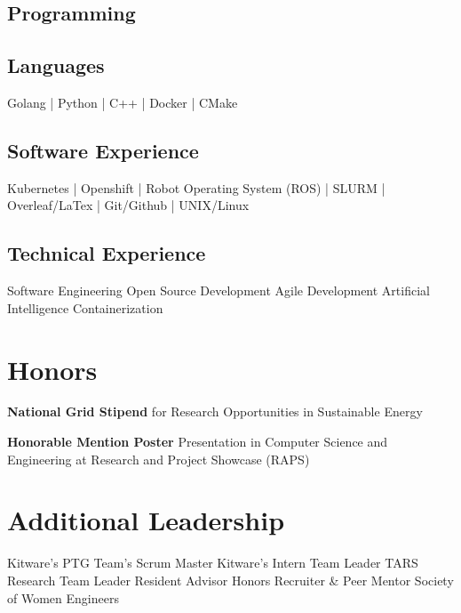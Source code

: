 \documentclass[]{deedy-resume-reversed}
\begin{document}
\begin{minipage}[t]{0.29\textwidth}
\subsection{Programming}
\subsection{Languages}
Golang | Python | C++ | \newline
Docker | CMake
\sectionsep

\subsection{Software Experience}
Kubernetes | Openshift | \newline
Robot Operating System (ROS) | \newline
SLURM |  \newline
Overleaf/LaTex |\newline
Git/Github | UNIX/Linux 
\sectionsep

\subsection{Technical Experience}
Software Engineering \newline
Open Source Development \newline
Agile Development \newline 
Artificial Intelligence \newline
Containerization %
\sectionsep

\section{Honors}

\textbf{National Grid Stipend} for Research Opportunities in Sustainable Energy
\sectionsep

\textbf{Honorable Mention Poster} Presentation in Computer Science and Engineering at Research and Project Showcase (RAPS)
\sectionsep

\section{Additional Leadership}

Kitware's PTG Team's Scrum Master \newline
Kitware's Intern Team Leader \newline
TARS Research Team Leader \newline
Resident Advisor \newline
Honors Recruiter \& Peer Mentor \newline
Society of Women Engineers


\end{minipage} %
\end{document}

